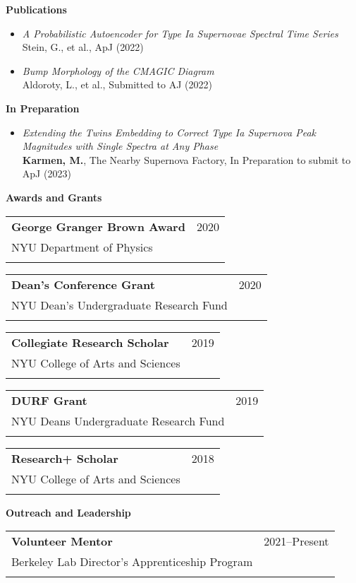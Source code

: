 \documentclass[letterpaper,10pt]{article}
\makeatletter
\newcounter{descounter}
\newcommand{\resetcounter}[0]{\setcounter{descounter}{0}}
\newcommand{\resheading}[1]{\resetcounter \vspace{15pt} {\Large \textbf{#1}} \\ \vspace{-8pt}
    \hrulefill\vspace{5pt}}
\newcommand{\ressubheading}[5]{
    \vspace{10pt}
    \begin{tabular*}{7.0in}{l@{\extracolsep{\fill}}r}
        \textbf{#1} & #2 \\
        #3 & #4 \\
        #5 & \\
    \end{tabular*}\vspace{-5pt}
}
\newcommand{\descheader}[1]{\textbf{#1}}
\makeatother
\begin{document}
\clearpage

\resheading{Publications}

\begin{itemize}
        \item{ \textit{A Probabilistic Autoencoder for Type Ia Supernovae Spectral Time Series} \\Stein, G., et al., ApJ (2022) }
        
        \item{\textit{Bump Morphology of the CMAGIC Diagram} \\ Aldoroty, L., et al., Submitted to AJ (2022)}

\end{itemize}

\descheader{In Preparation}
    
    \begin{itemize}
    
        \item{ \textit{Extending the Twins Embedding to Correct Type Ia Supernova Peak Magnitudes with Single Spectra at Any Phase} \\ \textbf{Karmen, M.}, The Nearby Supernova Factory, In Preparation to submit to ApJ (2023) }
        \vspace{-5pt}
        
    \end{itemize}

\resheading{Awards and Grants}
    
    \ressubheading{George Granger Brown Award}{2020}{NYU Department of Physics}{}{}{}
    
    \vspace{-0.15in}
    \ressubheading{Dean's Conference Grant}{2020}{NYU Dean's Undergraduate Research Fund}{}{}{}
    
    \vspace{-0.15in}
    \ressubheading{Collegiate Research Scholar}{2019}{NYU College of Arts and Sciences}{}{}{}
    
    \vspace{-0.15in}
    \ressubheading{DURF Grant}{2019}{NYU Deans Undergraduate Research Fund}{}{}{}
    
    \vspace{-0.15in}
    \ressubheading{Research+ Scholar}{2018}{NYU College of Arts and Sciences}{}{}{}
    \vspace{-0.15in}

\resheading{Outreach and Leadership}

    \ressubheading{Volunteer Mentor}{2021--Present}{Berkeley Lab Director's Apprenticeship Program}{}{}
    \vspace{-0.15in}
    
\end{document}
